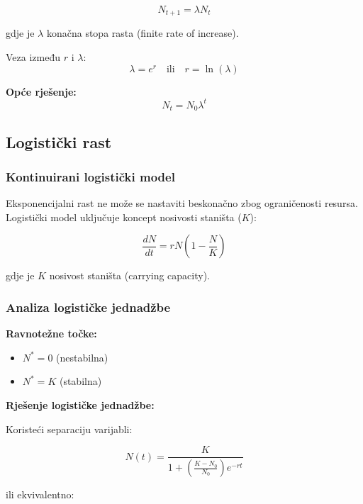 \documentclass[11pt,oneside]{book}
\begin{document}
\begin{equation}
	N_{t+1} = \lambda N_t
\end{equation}

gdje je $\lambda$ konačna stopa rasta (finite rate of increase).

Veza između $r$ i $\lambda$:
\begin{equation}
	\lambda = e^r \quad \text{ili} \quad r = \ln(\lambda)
\end{equation}

\textbf{Opće rješenje:}
\begin{equation}
	N_t = N_0 \lambda^t
\end{equation}

\subsection{Logistički rast}

\subsubsection{Kontinuirani logistički model}

Eksponencijalni rast ne može se nastaviti beskonačno zbog ograničenosti resursa. Logistički model uključuje koncept nosivosti staništa ($K$):

\begin{equation}
	\frac{dN}{dt} = rN\left(1 - \frac{N}{K}\right)
\end{equation}

gdje je $K$ nosivost staništa (carrying capacity).

\subsubsection{Analiza logističke jednadžbe}

\textbf{Ravnotežne točke:}
\begin{itemize}
	\item $N^* = 0$ (nestabilna)
	\item $N^* = K$ (stabilna)
\end{itemize}

\textbf{Rješenje logističke jednadžbe:}

Koristeći separaciju varijabli:

\begin{equation}
	N(t) = \frac{K}{1 + \left(\frac{K-N_0}{N_0}\right)e^{-rt}}
\end{equation}

ili ekvivalentno:
\end{document}
